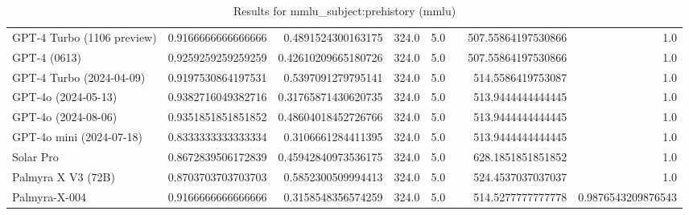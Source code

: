 \begin{table}[htp]
{\begin{tabular}{lrrrrrrr}
GPT-4 Turbo (1106 preview) & 0.9166666666666666 & 0.4891524300163175 & 324.0 & 5.0 &  & 507.55864197530866 & 1.0 \\
GPT-4 (0613) & 0.9259259259259259 & 0.42610209665180726 & 324.0 & 5.0 &  & 507.55864197530866 & 1.0 \\
GPT-4 Turbo (2024-04-09) & 0.9197530864197531 & 0.5397091279795141 & 324.0 & 5.0 &  & 514.5586419753087 & 1.0 \\
GPT-4o (2024-05-13) & 0.9382716049382716 & 0.31765871430620735 & 324.0 & 5.0 &  & 513.9444444444445 & 1.0 \\
GPT-4o (2024-08-06) & 0.9351851851851852 & 0.48604018452726766 & 324.0 & 5.0 &  & 513.9444444444445 & 1.0 \\
GPT-4o mini (2024-07-18) & 0.8333333333333334 & 0.3106661284411395 & 324.0 & 5.0 &  & 513.9444444444445 & 1.0 \\
Solar Pro & 0.8672839506172839 & 0.45942840973536175 & 324.0 & 5.0 &  & 628.1851851851852 & 1.0 \\
Palmyra X V3 (72B) & 0.8703703703703703 & 0.5852300509994413 & 324.0 & 5.0 &  & 524.4537037037037 & 1.0 \\
Palmyra-X-004 & 0.9166666666666666 & 0.3158548356574259 & 324.0 & 5.0 &  & 514.5277777777778 & 0.9876543209876543 \\
\bottomrule
\end{tabular}}
\caption{Results for mmlu_subject:prehistory (mmlu)}
\label{fig:mmlu_subject:prehistory (mmlu)}
\end{table}